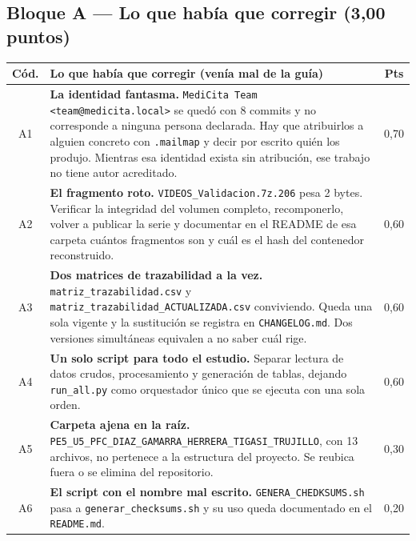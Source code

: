 \documentclass[11pt,a4paper]{article}
\newcommand{\cabA}{\toprule \textbf{Cód.} & \textbf{Lo que había que corregir (venía mal de la guía)} & \textbf{Pts} \\ \midrule}
\begin{document}
\subsection*{Bloque A — Lo que había que corregir (3,00 puntos)}
\begin{xltabular}{\textwidth}{@{}c>{\raggedright\arraybackslash}X c@{}}
\cabA
A1 & \textbf{La identidad fantasma.} \texttt{MediCita Team <team@medicita.local>} se quedó con 8 commits y no corresponde a ninguna persona declarada. Hay que atribuirlos a alguien concreto con \texttt{.mailmap} y decir por escrito quién los produjo. Mientras esa identidad exista sin atribución, ese trabajo no tiene autor acreditado. & 0{,}70 \\ \addlinespace
A2 & \textbf{El fragmento roto.} \texttt{VIDEOS\_Validacion.7z.206} pesa 2 bytes. Verificar la integridad del volumen completo, recomponerlo, volver a publicar la serie y documentar en el README de esa carpeta cuántos fragmentos son y cuál es el hash del contenedor reconstruido. & 0{,}60 \\ \addlinespace
A3 & \textbf{Dos matrices de trazabilidad a la vez.} \texttt{matriz\_trazabilidad.csv} y \texttt{matriz\_trazabilidad\_ACTUALIZADA.csv} conviviendo. Queda una sola vigente y la sustitución se registra en \texttt{CHANGELOG.md}. Dos versiones simultáneas equivalen a no saber cuál rige. & 0{,}60 \\ \addlinespace
A4 & \textbf{Un solo script para todo el estudio.} Separar lectura de datos crudos, procesamiento y generación de tablas, dejando \texttt{run\_all.py} como orquestador único que se ejecuta con una sola orden. & 0{,}60 \\ \addlinespace
A5 & \textbf{Carpeta ajena en la raíz.} \texttt{PE5\_U5\_PFC\_DIAZ\_GAMARRA\_HERRERA\_TIGASI\_TRUJILLO}, con 13 archivos, no pertenece a la estructura del proyecto. Se reubica fuera o se elimina del repositorio. & 0{,}30 \\ \addlinespace
A6 & \textbf{El script con el nombre mal escrito.} \texttt{GENERA\_CHEDKSUMS.sh} pasa a \texttt{generar\_checksums.sh} y su uso queda documentado en el \texttt{README.md}. & 0{,}20 \\
\bottomrule
\end{xltabular}
\end{document}
